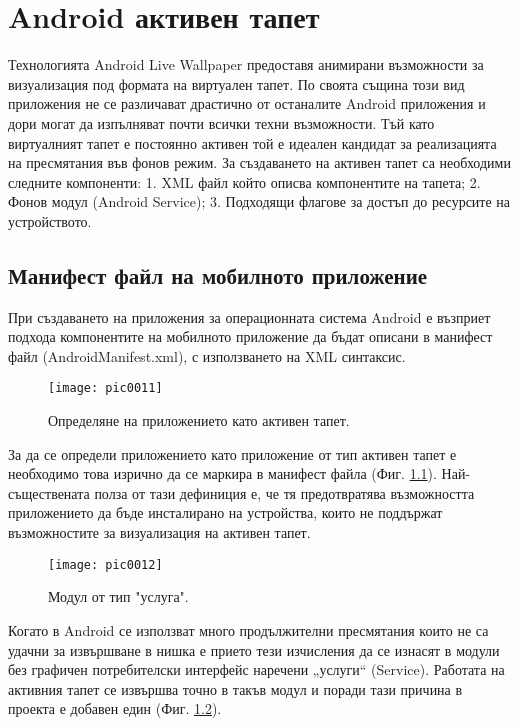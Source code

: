 \newpage
\chapter{Android активен тапет}
\label{chapter04}

Технологията Android Live Wallpaper предоставя анимирани възможности за визуализация под формата на виртуален тапет. По своята същина този вид приложения не се различават драстично от останалите Android  приложения и дори могат да изпълняват почти всички техни възможности. Тъй като виртуалният тапет е постоянно активен той е идеален кандидат за реализацията на пресмятания във фонов режим. За създаването на активен тапет са необходими следните компоненти: 1. XML файл който описва компонентите на тапета; 2. Фонов модул (Android Service); 3. Подходящи флагове за достъп до ресурсите на устройството. 

\section{Манифест файл на мобилното приложение}

При създаването на приложения за операционната система Android е възприет подхода компонентите на мобилното приложение да бъдат описани в манифест файл (AndroidManifest.xml), с използването на XML синтаксис. 

\begin{figure}[h]
  \centering
  \texttt{[image: pic0011]}
  \caption{Определяне на приложението като активен тапет.}
\label{fig:pic0011}
\end{figure}
\FloatBarrier

За да се определи приложението като приложение от тип активен тапет е необходимо това изрично да се маркира в манифест файла (Фиг. \ref{fig:pic0011}). Най-съществената полза от тази дефиниция е, че тя предотвратява възможността приложението да бъде инсталирано на устройства, които не поддържат възможностите за визуализация на активен тапет. 

\begin{figure}[h]
  \centering
  \texttt{[image: pic0012]}
  \caption{Модул от тип "услуга".}
\label{fig:pic0012}
\end{figure}
\FloatBarrier

Когато в Android се използват много продължителни пресмятания които не са удачни за извършване в нишка е прието тези изчисления да се изнасят в модули без графичен потребителски интерфейс наречени „услуги“ (Service). Работата на активния тапет се извършва точно в такъв модул и поради тази причина в проекта е добавен един (Фиг. \ref{fig:pic0012}).

